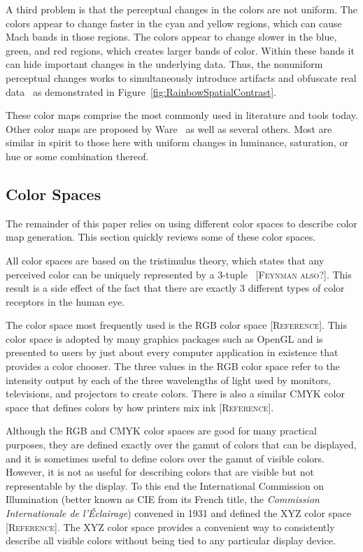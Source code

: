 \documentclass[twocolumn]{article}
\newcommand{\lcite}[1]{~\cite{#1}}
\newcommand{\scite}[1]{~\cite{#1}}
\newcommand{\sticky}[1]{\textsc{[#1]}}
\newcommand{\RGB}{RGB\xspace}
\newcommand{\CMYK}{CMYK\xspace}
\newcommand{\XYZ}{XYZ\xspace}
\begin{document}
A third problem is that the perceptual changes in the colors are not
uniform.  The colors appear to change faster in the cyan and yellow
regions, which can cause Mach bands in those regions.  The colors appear to
change slower in the blue, green, and red regions, which creates larger
bands of color.  Within these bands it can hide important changes in the
underlying data.  Thus, the nonuniform perceptual changes works to
simultaneously introduce artifacts and obfuscate real
data\lcite{Borland07} as demonstrated in
Figure~\ref{fig:RainbowSpatialContrast}.

These color maps comprise the most commonly used in literature and tools
today.  Other color maps are proposed by Ware\scite{Ware04} as well as
several others.  Most are similar in spirit to those here with uniform
changes in luminance, saturation, or hue or some combination thereof.

\subsection{Color Spaces}
\label{sec:PreviousWork:ColorSpaces}

The remainder of this paper relies on using different color spaces to
describe color map generation.  This section quickly reviews some of these
color spaces.

All color spaces are based on the tristimulus theory, which states that any
perceived color can be uniquely represented by a 3-tuple\lcite{Stone05}
\sticky{Feynman also?}.  This result is a side effect of the fact that there
are exactly 3 different types of color receptors in the human eye.

The color space most frequently used is the \RGB color space
\sticky{Reference}.  This color space is adopted by many graphics packages
such as OpenGL and is presented to users by just about every computer
application in existence that provides a color chooser.  The three values
in the \RGB color space refer to the intensity output by each of the three
wavelengths of light used by monitors, televisions, and projectors to
create colors.  There is also a similar \CMYK color space that defines
colors by how printers mix ink \sticky{Reference}.

Although the \RGB and \CMYK color spaces are good for many practical
purposes, they are defined exactly over the gamut of colors that can be
displayed, and it is sometimes useful to define colors over the gamut of
visible colors.  However, it is not as useful for describing colors that
are visible but not representable by the display.  To this end the
International Commission on Illumination (better known as CIE from its
French title, the \emph{Commission Internationale de l'\'{E}clairage})
convened in 1931 and defined the \XYZ color space \sticky{Reference}.  The
\XYZ color space provides a convenient way to consistently describe all
visible colors without being tied to any particular display device.
\end{document}
